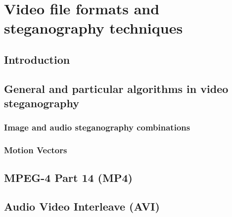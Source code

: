 
\chapter{Video file formats and steganography techniques}

\section{Introduction}

\section{General and particular algorithms in video steganography}
\subsection{Image and audio steganography combinations}
\subsection{Motion Vectors}

\section{MPEG-4 Part 14 (MP4)}

\section{Audio Video Interleave (AVI)}